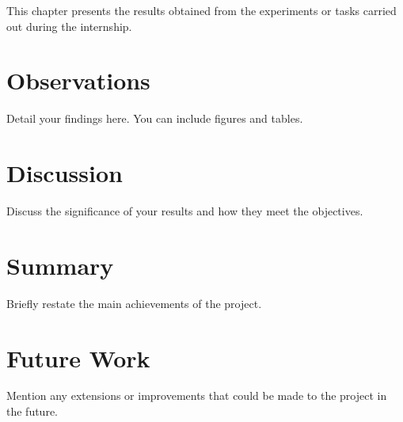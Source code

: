 This chapter presents the results obtained from the experiments or tasks carried out during the internship.

\section{Observations}
Detail your findings here. You can include figures and tables.


\section{Discussion}
Discuss the significance of your results and how they meet the objectives.

\section{Summary}
Briefly restate the main achievements of the project.

\section{Future Work}
Mention any extensions or improvements that could be made to the project in the future.
